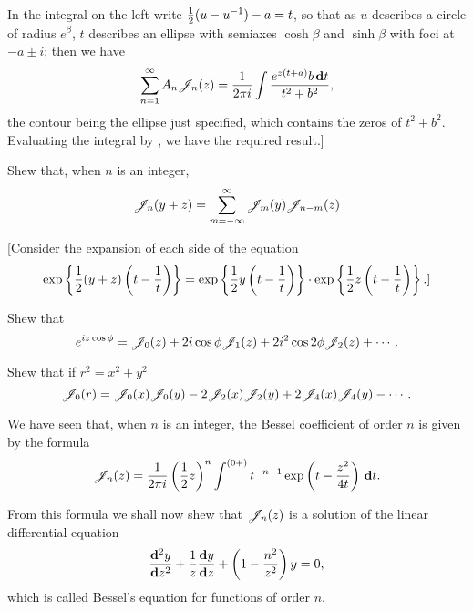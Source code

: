 % 
% 
In the integral on the left write $\frac{1}{2} (u - u^{-1}) - a = t$, so that as
$u$ describes a circle of radius $e^{\beta}$, $t$ describes an ellipse
with 
semiaxes $\cosh\beta$ and $\sinh\beta$ with foci at 
$-a \pm i$; then we have
$$
\sum_{n=1}^{\infty}
A_{n} \mathscr{J}_{n}(z)
=
\frac{1}{2\pi i}
\int
\frac{ e^{z(t+a)}b \, \mathbf{d} t  }{ t^{2} + b^{2}  },
$$
the contour being the ellipse just specified, which contains the zeros
of $t^{2} + b^{2}$. Evaluating the integral by 
, we have the required result.]
\begin{wandwexample}
  Shew that, when $n$ is an integer,
  $$
  \mathscr{J}_{n}(y+z)
  =
  \sum_{m = -\infty}^{\infty} \mathscr{J}_{m}(y) \mathscr{J}_{n-m}(z)
  $$
\end{wandwexample}
[Consider the expansion of each side of the equation
$$
\exp \left\{  \frac{1}{2} (y+z) \left( t - \frac{1}{t} \right)   \right\}
=
\exp \left\{  \frac{1}{2} y \left( t - \frac{1}{t} \right)   \right\}
\cdot
\exp \left\{  \frac{1}{2} z \left( t - \frac{1}{t} \right)   \right\}.]
$$
\begin{wandwexample}
  Shew that 
  $$
  e^{i z \cos \phi}
  = 
  \mathscr{J}_{0}(z)
  + 2 i \cos\phi \mathscr{J}_{1}(z)
  + 2 i^{2} \cos 2\phi \mathscr{J}_{2}(z)
  + \cdots.
  $$
\end{wandwexample}
\begin{wandwexample}
  Shew that if $r^{2} = x^{2} + y^{2}$
  $$
  \mathscr{J}_{0}(r)
  =
  \mathscr{J}_{0}(x)\mathscr{J}_{0}(y)
  - 2 \mathscr{J}_{2}(x) \mathscr{J}_{2}(y)
  + 2 \mathscr{J}_{4}(x) \mathscr{J}_{4}(y)
  - \cdots .
  $$
\end{wandwexample}

We have seen that, when $n$ is an integer, the Bessel coefficient of
order $n$ is given by the formula
$$
\mathscr{J}_{n}(z)
=
\frac{1}{2\pi i} 
\left( \frac{1}{2} z \right)^{n}
\int^{(0+)}
t^{-n-1}
\exp\left(  t - \frac{z^{2}}{4t}   \right)
\, \mathbf{d} t.
$$

From this formula we shall now shew that $\mathscr{J}_{n}(z)$ is a solution of the
linear differential equation
$$
\frac{\mathbf{d}^{2} y}{\mathbf{d} z^{2}}
+ \frac{1}{z} \frac{\mathbf{d} y}{\mathbf{d} z}
+ \left(  1 - \frac{n^{2}}{z^{2}}   \right) y
= 0,
$$
which is called Bessel's equation for functions of order $n$.

